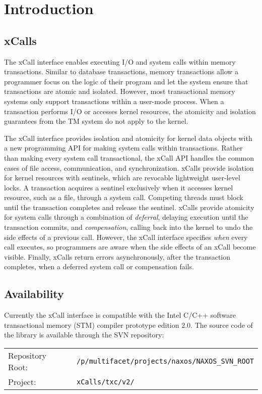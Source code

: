 \section{Introduction}

\subsection{xCalls}
The xCall interface enables  executing I/O and system calls
within memory transactions. Similar to database transactions, memory
transactions allow a programmer focus on the logic of their program
and let the system ensure that transactions are atomic and
isolated. However, most transactional memory systems only support
transactions within a user-mode process. When a transaction performs
I/O or accesses kernel resources, the atomicity and isolation guarantees
from the TM system do not apply to the kernel.

The xCall interface provides isolation and atomicity for kernel data
objects with a new programming API for making system calls within
transactions. Rather than making every system call transactional, the xCall API
handles the common cases of file access, communication, and
synchronization. xCalls provide isolation for kernel resources with
sentinels, which are revocable lightweight user-level locks. A
transaction acquires a sentinel exclusively when it accesses kernel
resource, such as a file, through a system call. Competing threads
must block until the transaction completes and release the
sentinel. xCalls provide atomicity for system calls through a
combination of {\em deferral}, delaying execution until the
transaction commits, and {\em compensation}, calling back into the
kernel to undo the side effects of a previous call. However, the xCall
interface specifies {\em when} every call executes, so programmers are
aware when the side effects of an xCall become visible. Finally,
xCalls return errors asynchronously, after the transaction completes,
when a deferred system call or compensation fails.

\subsection{Availability}
Currently the xCall interface is compatible with the Intel C/C++ software
transactional memory (STM) compiler prototype edition 2.0. The source 
code of the library is available through the SVN repository:
\newline
\begin{tabular}{ll}
Repository Root: & \verb!/p/multifacet/projects/naxos/NAXOS_SVN_ROOT! \\
Project: & \verb!xCalls/txc/v2/!
\end{tabular}
